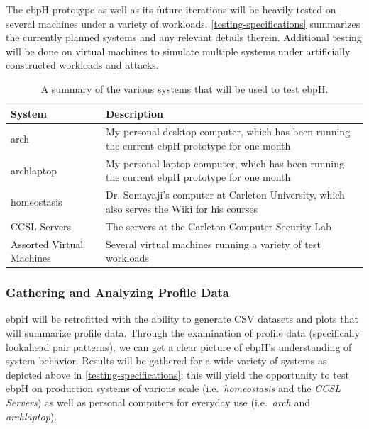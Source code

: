 \documentclass[
  12pt]{findlay}
\begin{document}
The ebpH prototype as well as its future iterations will be heavily
tested on several machines under a variety of workloads.
\autoref{testing-specifications} summarizes the currently planned
systems and any relevant details therein. Additional testing will be
done on virtual machines to simulate multiple systems under artificially
constructed workloads and attacks.

\begin{table}
\caption[A summary of the various systems that will be used to test ebpH]
{
A summary of the various systems that will be used to test ebpH.
}
\label{testing-specifications}
\begin{center}
\begin{tabular}{|l|p{4in}|}
\hline
\textbf{System} & \textbf{Description}\\
\hline
\hline
arch & My personal desktop computer, which has been running the current ebpH prototype for one month\\
\hline
archlaptop & My personal laptop computer, which has been running the current ebpH prototype for one month\\
\hline
homeostasis & Dr. Somayaji's computer at Carleton University, which also serves the Wiki for his courses\\
\hline
CCSL Servers & The servers at the Carleton Computer Security Lab\\
\hline
Assorted Virtual Machines & Several virtual machines running a variety of test workloads\\
\hline
\end{tabular}
\end{center}
\end{table}

\hypertarget{gathering-and-analyzing-profile-data}{%
\subsubsection{Gathering and Analyzing Profile
Data}\label{gathering-and-analyzing-profile-data}}

ebpH will be retrofitted with the ability to generate CSV datasets and
plots that will summarize profile data. Through the examination of
profile data (specifically lookahead pair patterns), we can get a clear
picture of ebpH's understanding of system behavior. Results will be
gathered for a wide variety of systems as depicted above in
\autoref{testing-specifications}; this will yield the opportunity to
test ebpH on production systems of various scale
(i.e.~\emph{homeostasis} and the \emph{CCSL Servers}) as well as
personal computers for everyday use (i.e.~\emph{arch} and
\emph{archlaptop}).
\end{document}
